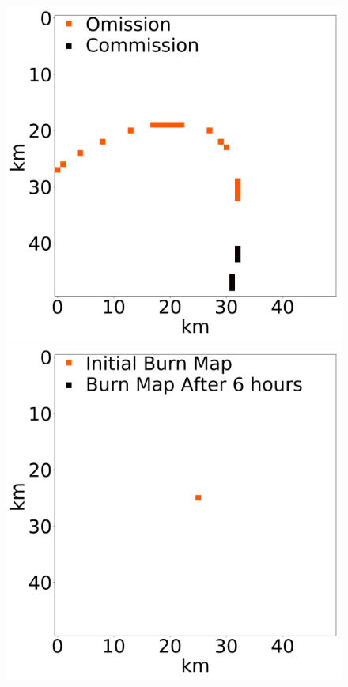 \documentclass[smallcondensed]{svjour3}     %
\begin{document}
\begin{figure}[htbp]
	\includegraphics[height=0.17\textheight]{exampleNetworkError2.png}
	\\
	\includegraphics[height=0.17\textheight]{exampleFusedFire3.png}

\end{figure}
\end{document}
